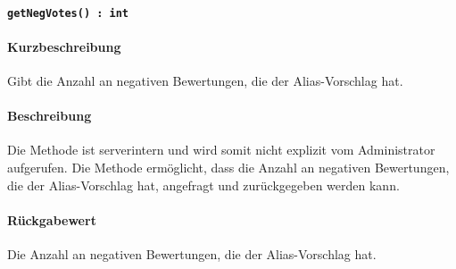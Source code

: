 \paragraph*{\texttt{getNegVotes() : int}}%
\paragraph*{Kurzbeschreibung}
Gibt die Anzahl an negativen Bewertungen, die der Alias-Vorschlag hat.
\paragraph*{Beschreibung}
Die Methode ist serverintern und wird somit nicht explizit vom Administrator aufgerufen.
Die Methode ermöglicht, dass die Anzahl an negativen Bewertungen, die der Alias-Vorschlag hat, angefragt und zurückgegeben werden kann.
\paragraph*{Rückgabewert}
Die Anzahl an negativen Bewertungen, die der Alias-Vorschlag hat.
